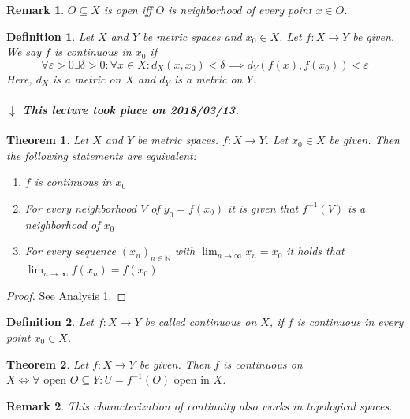 \documentclass{article}
\newtheorem{theorem}{Theorem}  \numberwithin{theorem}{section}
\newtheorem{definition}{Definition}  \numberwithin{definition}{section}
\newtheorem{remark}{Remark}  \numberwithin{remark}{section}
\newcommand{\dateref}[1]{%
  \begin{mdframed}[backgroundcolor=gray!10,innerbottommargin=0pt,innertopmargin=0pt]
    \paragraph{\textit{$\downarrow$ This lecture took place on #1.}}%
  \end{mdframed}%
}
\begin{document}
\begin{remark}
  $O \subseteq X$ is open iff $O$ is neighborhood of every point $x \in O$.
\end{remark}

\begin{definition}
  Let $X$ and $Y$ be metric spaces and $x_0 \in X$.
  Let $f: X \to Y$ be given. We say $f$ is continuous in $x_0$ if
  \[ \forall \varepsilon > 0 \exists \delta > 0: \forall x \in X: d_X(x, x_0) < \delta \implies d_Y(f(x), f(x_0)) < \varepsilon \]
  Here, $d_X$ is a metric on $X$ and $d_Y$ is a metric on $Y$.
\end{definition}

\dateref{2018/03/13}

\begin{theorem} %
  \label{satz3t}
  Let $X$ and $Y$ be metric spaces. $f: X \to Y$. Let $x_0 \in X$ be given.
  Then the following statements are equivalent:
  \begin{enumerate}
    \item $f$ is continuous in $x_0$
    \item For every neighborhood $V$ of $y_0 = f(x_0)$ it is given that $f^{-1}(V)$ is a neighborhood of $x_0$
    \item For every sequence $(x_n)_{n \in \mathbb N}$ with $\lim_{n\to\infty} x_n = x_0$ it holds that $\lim_{n\to\infty} f(x_n) = f(x_0)$
  \end{enumerate}
\end{theorem}

\begin{proof}
  See Analysis 1.
\end{proof}

\begin{definition} %
  Let $f: X \to Y$ be called continuous on $X$, if $f$ is continuous in every point $x_0 \in X$.
\end{definition}

\begin{theorem} %
  Let $f: X \to Y$ be given.
  Then $f$ is continuous on $X \iff \forall \text{ open } O \subseteq Y: U = f^{-1}(O) \text{ open in } X$.
\end{theorem}

\begin{remark}
  This characterization of continuity also works in topological spaces.
\end{remark}
\end{document}
